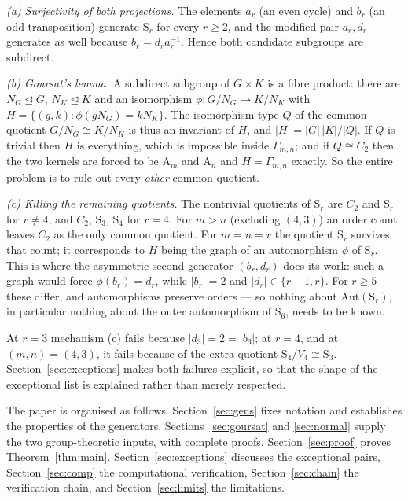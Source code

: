\documentclass[11pt]{article}
\theoremstyle{plain}
\theoremstyle{definition}
\theoremstyle{remark}
\numberwithin{equation}{section}
\newcommand{\Sym}{\mathrm{S}}
\newcommand{\Alt}{\mathrm{A}}
\newcommand{\Gam}{\Gamma}
\newcommand{\normal}{\trianglelefteq}
\begin{document}
\emph{(a) Surjectivity of both projections.} The elements $a_r$ (an even cycle) and $b_r$ (an odd
transposition) generate $\Sym_r$ for every $r \ge 2$, and the modified pair $a_r,d_r$ generates
as well because $b_r = d_r a_r^{-1}$. Hence both candidate subgroups are subdirect.

\emph{(b) Goursat's lemma.} A subdirect subgroup of $G \times K$ is a fibre product: there are
$N_G \normal G$, $N_K \normal K$ and an isomorphism $\phi : G/N_G \to K/N_K$ with
$H = \{(g,k) : \phi(gN_G) = kN_K\}$. The isomorphism type $Q$ of the common quotient $G/N_G
\cong K/N_K$ is thus an invariant of $H$, and $|H| = |G|\,|K|/|Q|$. If $Q$ is trivial then
$H$ is everything, which is impossible inside $\Gam_{m,n}$; and if $Q \cong C_2$ then the two
kernels are forced to be $\Alt_m$ and $\Alt_n$ and $H = \Gam_{m,n}$ exactly. So the entire
problem is to rule out every \emph{other} common quotient.

\emph{(c) Killing the remaining quotients.} The nontrivial quotients of $\Sym_r$ are $C_2$ and
$\Sym_r$ for $r \ne 4$, and $C_2$, $\Sym_3$, $\Sym_4$ for $r = 4$. For $m > n$ (excluding
$(4,3)$) an order count leaves $C_2$ as the only common quotient. For $m = n = r$ the quotient
$\Sym_r$ survives that count; it corresponds to $H$ being the graph of an automorphism $\phi$ of
$\Sym_r$. This is where the asymmetric second generator $(b_r,d_r)$ does its work: such a graph
would force $\phi(b_r) = d_r$, while $|b_r| = 2$ and $|d_r| \in \{r-1,r\}$. For $r \ge 5$ these
differ, and automorphisms preserve orders --- so nothing about $\mathrm{Aut}(\Sym_r)$, in
particular nothing about the outer automorphism of $\Sym_6$, needs to be known.

At $r = 3$ mechanism (c) fails because $|d_3| = 2 = |b_3|$; at $r = 4$, and at $(m,n) = (4,3)$,
it fails because of the extra quotient $\Sym_4/V_4 \cong \Sym_3$. Section~\ref{sec:exceptions}
makes both failures explicit, so that the shape of the exceptional list is explained rather than
merely respected.

The paper is organised as follows. Section~\ref{sec:gens} fixes notation and establishes the
properties of the generators. Sections~\ref{sec:goursat} and \ref{sec:normal} supply the two
group-theoretic inputs, with complete proofs. Section~\ref{sec:proof} proves
Theorem~\ref{thm:main}. Section~\ref{sec:exceptions} discusses the exceptional pairs,
Section~\ref{sec:comp} the computational verification, Section~\ref{sec:chain} the verification
chain, and Section~\ref{sec:limits} the limitations.
\end{document}
